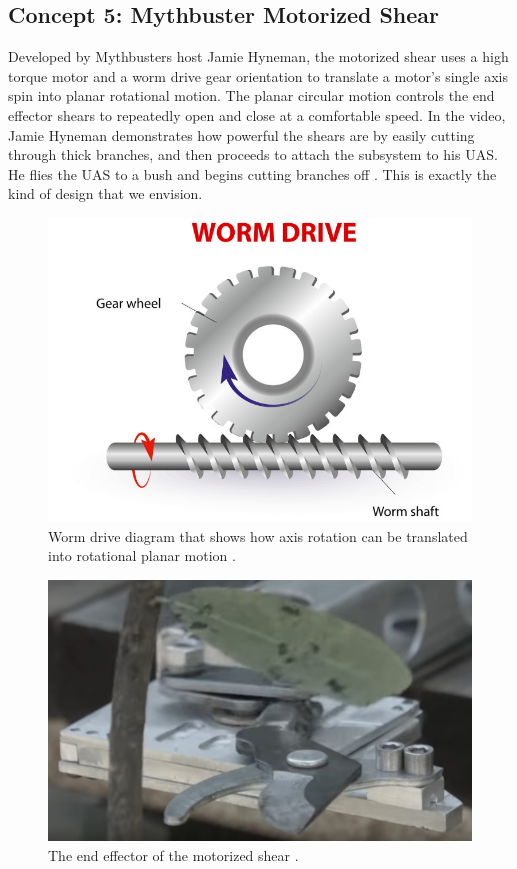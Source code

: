 \documentclass{wrcecapstone}
\begin{document}
\subsection{Concept 5: Mythbuster Motorized Shear}
Developed by Mythbusters host Jamie Hyneman, the motorized shear uses a high torque motor and a worm drive gear orientation to translate a motor’s single axis spin into planar rotational motion. The planar circular motion controls the end effector shears to repeatedly open and close at a comfortable speed. In the video, Jamie Hyneman demonstrates how powerful the shears are by easily cutting through thick branches, and then proceeds to attach the subsystem to his UAS. He flies the UAS to a bush and begins cutting branches off \cite{mbed2019}. This is exactly the kind of design that we envision.
\begin{figure}
\begin{center}
\includegraphics[width=0.5\columnwidth]{figures/fig451.png}
\end{center}
\caption{Worm drive diagram that shows how axis rotation can be translated into rotational planar motion \cite{wikipedia2019wormdrive}.}
\label{fig:4.5.1}
\end{figure}
\begin{figure}
\begin{center}
\includegraphics[width=0.4\columnwidth]{figures/fig452.png}
\end{center}
\caption{The end effector of the motorized shear \cite{mbed2019}.}
\label{fig:4.5.2}
\end{figure}
\end{document}
